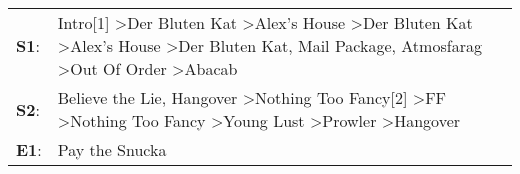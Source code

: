 \begin{supertabular}{p{0.03\textwidth}p{0.92\textwidth}}
 \textbf{S1}:  &  Intro[1]\textsuperscript{} \textgreater \enspace Der Bluten Kat\textsuperscript{} \textgreater \enspace Alex's House\textsuperscript{} \textgreater \enspace Der Bluten Kat\textsuperscript{} \textgreater \enspace Alex's House\textsuperscript{} \textgreater \enspace Der Bluten Kat\textsuperscript{}, \enspace Mail Package\textsuperscript{}, \enspace Atmosfarag\textsuperscript{} \textgreater \enspace Out Of Order\textsuperscript{} \textgreater \enspace Abacab\textsuperscript{}  \enspace  \\
 \textbf{S2}:  &                                                                                                   Believe the Lie\textsuperscript{}, \enspace Hangover\textsuperscript{} \textgreater \enspace Nothing Too Fancy[2]\textsuperscript{} \textgreater \enspace FF\textsuperscript{} \textgreater \enspace Nothing Too Fancy\textsuperscript{} \textgreater \enspace Young Lust\textsuperscript{} \textgreater \enspace Prowler\textsuperscript{} \textgreater \enspace Hangover\textsuperscript{}  \enspace  \\
 \textbf{E1}:  &                                                                                                                                                                                                                                                                                                                                                                                                                                                               Pay the Snucka\textsuperscript{}  \enspace  \\
\end{supertabular}
